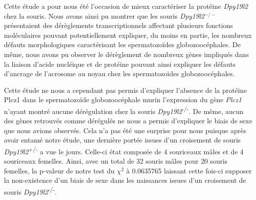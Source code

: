 \documentclass[12pt,a4paper,twoside]{ugathesis}
\theoremstyle{definition}
\theoremstyle{definition}
\theoremstyle{definition}
\theoremstyle{remark}
\begin{document}
Cette étude a pour nous été l'occasion de mieux caractériser la protéine
\emph{Dpy19l2} chez la souris. Nous avons ainsi pu montrer que les
souris \emph{Dpy19l2}\(^{-/-}\) présentaient des dérèglements
transcriptionnels affectant plusieurs fonctions moléculaires pouvant
potentiellement expliquer, du moins en partie, les nombreux défauts
morphologiques caractérisant les spermatozoïdes globozoocéphales. De
même, nous avons pu observer le dérèglement de nombreux gènes impliqués
dans la liaison d'acide nucléique et de protéine pouvant ainsi expliquer
les défauts d'ancrage de l'acrosome au noyau chez les spermatozoïdes
globozoocéphales.

Cette étude ne nous a cependant pas permis d'expliquer l'absence de la
protéine Plcz1 dans le spermatozoïde globozoocéphale murin l'expression
du gène \emph{Plcz1} n'ayant montré aucune dérégulation chez la souris
\emph{Dpy19l2}\textsuperscript{-/-}. De même, aucun des gènes retrouvés
comme dérégulés ne nous a permis d'expliquer le biais de sexe que nous
avions observés. Cela n'a pas été une surprise pour nous puisque après
avoir entamé notre étude, une dernière portée issues d'un croisement de
souris \emph{Dpy19l2}\textsuperscript{+/-} a vue le jours. Celle-ci état
composée de 4 souriceaux mâles et de 4 souriceaux femelles. Ainsi, avec
un total de 32 souris mâles pour 20 souris femelles, la p-valeur de
notre test du \(\chi^2\) à 0.0635765 laissant cette fois-ci supposer la
non-existence d'un biais de sexe dans les naissances issues d'un
croisement de souris \emph{Dpy19l2}\textsuperscript{-/-}.
\end{document}
